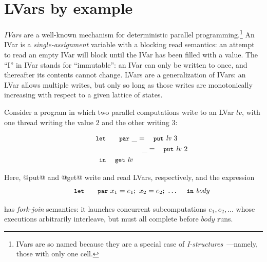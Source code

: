 \section{LVars by example}\label{s:lvars-examples}

\emph{IVars} \cite{IStructures, id, monad-par} are a well-known
mechanism for deterministic parallel programming.\footnote{IVars are so named
  because they are a special case of
  \emph{I-structures}~\cite{IStructures}---namely, those with only one
  cell.}  An IVar is a
\emph{single-assignment} variable \cite{Tesler-1968} with a blocking
read semantics: an attempt to read an empty IVar will block until the
IVar has been filled with a value.  The ``I'' in IVar stands for
``immutable'': an IVar can only be written to once, and thereafter its
contents cannot change.  LVars are a generalization of IVars: an LVar
allows multiple writes, but only so long as those writes are
monotonically increasing with respect to a given
lattice of states.

Consider a program in which two
parallel computations write to an LVar $\mathit{lv}$, with one thread
writing the value $2$ and the other writing $3$:


\vspace{-8mm}
\singlespacing
\begin{equation}
\begin{split}
& \LETPAR ~\_ = \putexp{\mathit{lv}}{3} \\
&  \letparspace ~\_ = \putexp{\mathit{lv}}{2} \\
&  \letspace \IN~ \GET~\mathit{lv}
\end{split}
\label{e:lvar-example-1}
\end{equation}
\doublespacing

Here, @put@ and @get@ write and read LVars,
respectively, and the expression
%
\vspace{-8mm}
\singlespacing
\begin{displaymath}
\letparexp{x_1}{e_1}{x_2}{e_2;~\dots}{\mathit{body}}
\end{displaymath}
\doublespacing

has \emph{fork-join} semantics: it launches concurrent subcomputations
$e_1, e_2, \dots$ whose executions arbitrarily interleave, but must
all complete before $\mathit{body}$ runs.

